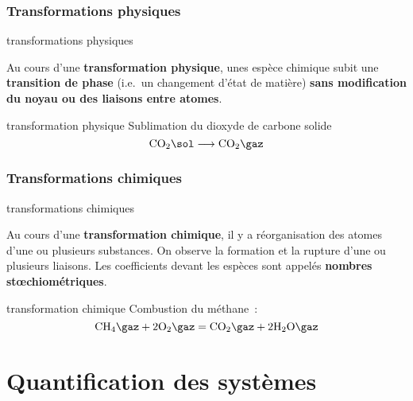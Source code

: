 \documentclass[../main/main.tex]{subfiles}
\begin{document}
\subsubsection{Transformations physiques}

\begin{tcbraster}[raster columns=2, raster equal height=rows]
    \begin{defi}[label=def:transnuc]{transformations physiques}

        Au cours d'une \textbf{transformation physique}, unes espèce chimique
        subit une \textbf{transition de phase} (i.e.\ un changement d'état de
        matière) \textbf{sans modification du noyau ou des liaisons entre
        atomes}.
    \end{defi}
    \begin{exem}[label=exem:transnuc]{transformation physique}
        Sublimation du dioxyde de carbone solide
        \[ \mathrm{CO}_2{}\sol
            \longrightarrow
        \mathrm{CO}_2{}\gaz\]
    \end{exem}
\end{tcbraster}

\subsubsection{Transformations chimiques}

\begin{tcbraster}[raster columns=2, raster equal height=rows]
    \begin{defi}[label=def:transnuc]{transformations chimiques}

        Au cours d'une \textbf{transformation chimique}, il y a réorganisation
        des atomes d'une ou plusieurs substances. On observe la formation et la
        rupture d'une ou plusieurs liaisons. Les coefficients devant les espèces
        sont appelés \textbf{nombres stœchiométriques}.
    \end{defi}
    \begin{exem}[label=exem:transnuc]{transformation chimique}
        Combustion du méthane~:
        \begin{equation*}
            \mathrm{CH}_4{}\gaz + 2\mathrm{O}_2{}\gaz
            =
            \mathrm{CO}_2{}\gaz + 2\mathrm{H}_2\mathrm{O}\gaz
        \end{equation*}
    \end{exem}
\end{tcbraster}

\section{Quantification des systèmes}
\end{document}
